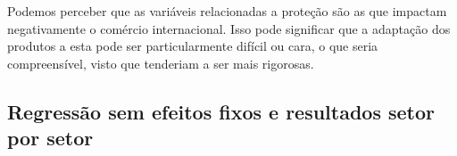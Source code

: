 \documentclass[12pt, a4paper]{article}
\begin{document}
Podemos perceber que as variáveis relacionadas a proteção são as que impactam negativamente o comércio internacional. Isso pode significar que a adaptação dos produtos a esta pode ser particularmente difícil ou cara, o que seria compreensível, visto que tenderiam a ser mais rigorosas.


\subsection{Regressão sem efeitos fixos e resultados setor por setor}





\printbibliography
\end{document}
